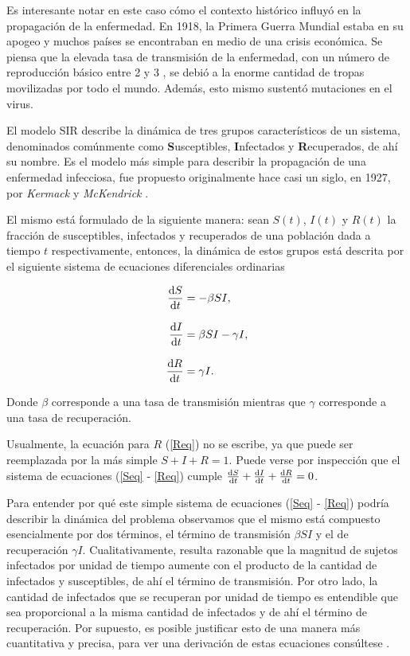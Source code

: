 Es interesante notar en este caso cómo el contexto histórico influyó en la propagación de la enfermedad. En 1918, la Primera Guerra Mundial estaba en su apogeo y 
muchos países se encontraban en medio de una crisis económica. Se piensa que la elevada tasa de transmisión de la enfermedad, con un número de reproducción básico entre 
2 y 3 \cite{gripe}, se debió a la enorme cantidad de tropas movilizadas por todo el mundo. Además, esto mismo sustentó mutaciones en el virus. 




El modelo SIR describe la dinámica de tres grupos característicos de un sistema, denominados comúnmente como \textbf{S}usceptibles, \textbf{I}nfectados y
\textbf{R}ecuperados, de ahí su nombre. Es el modelo más simple para describir la propagación de una enfermedad 
infecciosa, fue propuesto originalmente hace casi un siglo, en 1927, por \textit{Kermack} y \textit{McKendrick} \cite{SIR}. 

El mismo está formulado de la siguiente manera: sean $S(t)$, $I(t)$ y $R(t)$ la fracción de susceptibles, infectados
y recuperados de una población dada a tiempo $t$ respectivamente, entonces, la dinámica de estos grupos está descrita por el siguiente sistema de
ecuaciones diferenciales ordinarias

\begin{align}
  \dv{S}{t}&=-\beta SI,\label{Seq}\\[.3cm]
  \dv{I}{t}&=\beta SI - \gamma I,\label{Ieq}\\[.3cm]
  \dv{R}{t}&=\gamma I.\label{Req}
\end{align}


Donde $\beta$ corresponde a una tasa de transmisión mientras que $\gamma$ corresponde a una tasa de recuperación.

Usualmente, la ecuación para $R$ (\ref{Req}) no se escribe, ya que puede ser reemplazada por la más simple $S+I+R=1$. Puede verse por inspección que el sistema de ecuaciones
(\ref{Seq} - \ref{Req}) cumple $\dv{S}{t}+\dv{I}{t}+\dv{R}{t}=0$.

Para entender por qué este simple sistema de ecuaciones (\ref{Seq} - \ref{Req}) podría describir la dinámica del problema observamos que el mismo 
está compuesto esencialmente por dos términos, el término de transmisión $\beta SI$ y el de recuperación $\gamma I$. Cualitativamente, resulta 
razonable que la magnitud de sujetos infectados por unidad de tiempo aumente con el producto de la cantidad de infectados y susceptibles, de ahí 
el término de transmisión. Por otro lado, la cantidad de infectados que se recuperan por unidad de tiempo es entendible que sea proporcional a la
misma cantidad de infectados y de ahí el término de recuperación. Por supuesto, es posible justificar esto de una manera más cuantitativa y precisa, para 
ver una derivación de estas ecuaciones consúltese \cite{keeling:infectious_diseases}.

